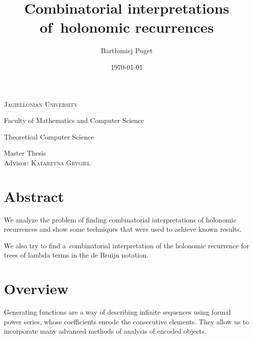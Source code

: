 \documentclass[final]{article}
\title{Combinatorial interpretations of~holonomic recurrences}
\author{Bartłomiej Puget}
\date{\today}
\theoremstyle{definition}
\theoremstyle{definition}
\theoremstyle{remark}
\begin{document}
\begin{titlepage}
	\begin{center}
	\textsc{\LARGE Jagiellonian University}

	\Large Faculty of Mathematics and Computer Science

	\Large Theoretical Computer Science

	\vfill

	\vspace{1cm}
	\hrulefill
	\vspace{0.5cm}

    \makeatletter
    \huge \textsc{\@title}
    \makeatother

	\vspace{0.2cm}
	\hrulefill

	\vspace{1cm}
    \makeatletter
	\textsc{\Large \@author}
    \makeatother

	\vspace{1cm}
    \normalsize

	Master Thesis\\
	Advisor: \textsc{Katarzyna Grygiel}

	\vfill

    \makeatletter
    \@date
    \makeatother
	\end{center}
\end{titlepage}

\section*{Abstract}%
\label{sec:abstract}

We analyze the problem of finding combinatorial interpretations of holonomic recurrences and show some techniques that were used to achieve known results.

We also try to find a~combinatorial interpretation of the holonomic recurrence for trees of lambda terms in the de Bruijn notation.

\clearpage

\tableofcontents
\clearpage

\section{Overview}%

Generating functions are a way of describing infinite sequences using formal power series, whose coefficients encode the consecutive elements. They allow us to incorporate many advanced methods of analysis of encoded objects.
\end{document}

